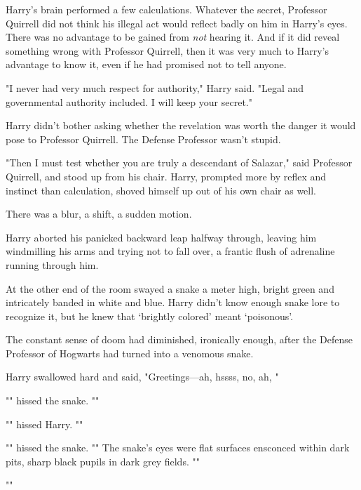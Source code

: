 Harry's brain performed a few calculations. Whatever the secret, Professor
Quirrell did not think his illegal act would reflect badly on him in Harry's
eyes. There was no advantage to be gained from \emph{not} hearing it. And if it
did reveal something wrong with Professor Quirrell, then it was very much to
Harry's advantage to know it, even if he had promised not to tell anyone.

"I never had very much respect for authority," Harry said. "Legal and
governmental authority included. I will keep your secret."

Harry didn't bother asking whether the revelation was worth the danger it would
pose to Professor Quirrell. The Defense Professor wasn't stupid.

"Then I must test whether you are truly a descendant of Salazar," said
Professor Quirrell, and stood up from his chair. Harry, prompted more by reflex
and instinct than calculation, shoved himself up out of his own chair as well.

There was a blur, a shift, a sudden motion.

Harry aborted his panicked backward leap halfway through, leaving him
windmilling his arms and trying not to fall over, a frantic flush of adrenaline
running through him.

At the other end of the room swayed a snake a meter high, bright green and
intricately banded in white and blue. Harry didn't know enough snake lore to
recognize it, but he knew that `brightly colored' meant `poisonous'.

The constant sense of doom had diminished, ironically enough, after the Defense
Professor of Hogwarts had turned into a venomous snake.

Harry swallowed hard and said, "Greetings---ah, hssss, no, ah,
"

"" hissed the snake. ""

"" hissed Harry. ""

"" hissed the snake. "" The snake's eyes were flat surfaces ensconced within dark pits, sharp
black pupils in dark grey fields. ""

""

